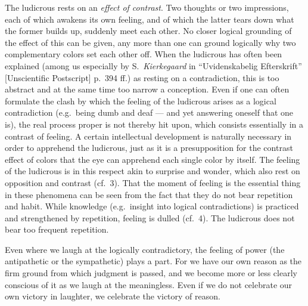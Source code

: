 \documentclass[12pt,a4paper]{book}
\newcommand{\opage}[1]{\marginnote{\footnotesize\textit{[#1]}}}
\begin{document}
The ludicrous rests on an \emph{effect of contrast}. Two thoughts or two
impressions, each of which awakens its own feeling, and of which the
latter tears down what the former builds up, suddenly meet each other.
No closer logical grounding of the effect of this can be given, any more
than one can ground logically why two complementary colors set each
other off. When the ludicrous has often been explained (among us
especially by S.~\emph{Kierkegaard} in ``Uvidenskabelig Efterskrift''
[Unscientific Postscript] p.~394 ff.) as resting on a contradiction,
this is too abstract and at the same time too narrow a conception. Even
if one can often formulate the clash by which the feeling of the
ludicrous arises as a logical contradiction (e.g.\ being dumb and deaf
--- and yet answering oneself that one is), the real process proper is
not thereby hit upon, which consists essentially in a contrast of
feeling. A certain intellectual development is naturally necessary in
order to apprehend the ludicrous, just as it is a presupposition for the
contrast effect of colors that the eye can apprehend each single color
by itself. The feeling of the ludicrous is in this respect akin to
surprise and wonder, which also rest
\opage{351}on opposition and contrast (cf.\ 3). That the moment of
feeling is the essential thing in these phenomena can be seen from the
fact that they do not bear repetition and habit. While knowledge (e.g.\
insight into logical contradictions) is practiced and strengthened by
repetition, feeling is dulled (cf.\ 4). The ludicrous does not bear too
frequent repetition.

Even where we laugh at the logically contradictory, the feeling of
power (the antipathetic or the sympathetic) plays a part. For we have
our own reason as the firm ground from which judgment is passed, and we
become more or less clearly conscious of it as we laugh at the
meaningless. Even if we do not celebrate our own victory in laughter, we
celebrate the victory of reason.
\end{document}

